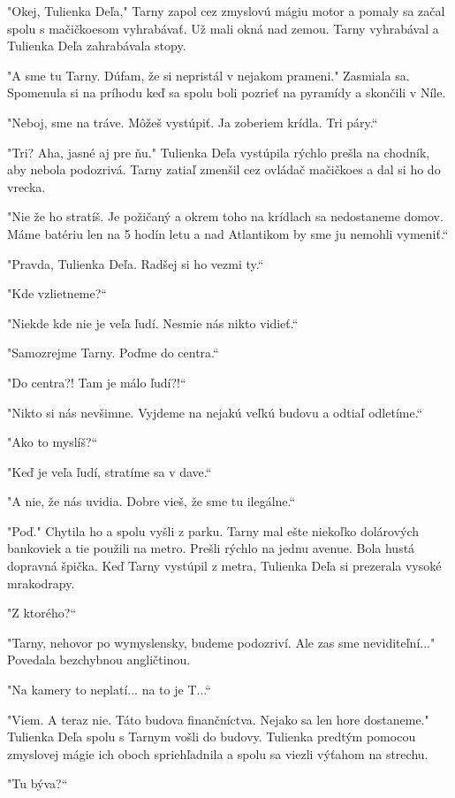 \documentclass{book}
\begin{document}
"$ $Okej, Tulienka Deľa,"$ $ Tarny zapol cez zmyslovú mágiu motor a pomaly sa začal spolu s mačičkoesom vyhrabávať. Už mali okná nad zemou. Tarny vyhrabával a Tulienka Deľa zahrabávala stopy.

"$ $A sme tu Tarny. Dúfam, že si nepristál v nejakom prameni."$ $ Zasmiala sa. Spomenula si na príhodu keď sa spolu boli pozrieť na pyramídy a skončili v Níle.

"Neboj, sme na tráve. Môžeš vystúpiť. Ja zoberiem krídla. Tri páry.“

"Tri? Aha, jasné aj pre ňu."$ $ Tulienka Deľa vystúpila rýchlo prešla na chodník, aby nebola podozrivá. Tarny zatiaľ zmenšil cez ovládač mačičkoes a dal si ho do vrecka.

"Nie že ho stratíš. Je požičaný a okrem toho na krídlach sa nedostaneme domov. Máme batériu len na 5 hodín letu a nad Atlantikom by sme ju nemohli vymeniť.“

"Pravda, Tulienka Deľa. Radšej si ho vezmi ty.“

"Kde vzlietneme?“

"Niekde kde nie je veľa ľudí. Nesmie nás nikto vidieť.“

"Samozrejme Tarny. Poďme do centra.“

"Do centra?! Tam je málo ľudí?!“

"Nikto si nás nevšimne. Vyjdeme na nejakú veľkú budovu a odtiaľ odletíme.“

"$ $Ako to myslíš?“

"Keď je veľa ľudí, stratíme sa v dave.“

"$ $A nie, že nás uvidia. Dobre vieš, že sme tu ilegálne.“

"Poď."$ $ Chytila ho a spolu vyšli z parku. Tarny mal ešte niekoľko dolárových bankoviek a tie použili na metro. Prešli rýchlo na jednu avenue. Bola hustá dopravná špička. Keď Tarny vystúpil z metra, Tulienka Deľa si prezerala vysoké mrakodrapy.

"Z ktorého?“

"Tarny, nehovor po wymyslensky, budeme podozriví. Ale zas sme neviditeľní..."$ $ Povedala bezchybnou angličtinou.

"Na kamery to neplatí... na to je T...“

"Viem. A teraz nie. Táto budova finančníctva. Nejako sa len hore dostaneme."$ $ Tulienka Deľa spolu s Tarnym vošli do budovy. Tulienka predtým pomocou zmyslovej mágie ich oboch spriehľadnila a spolu sa viezli výťahom na strechu.

"Tu býva?“
\end{document}
